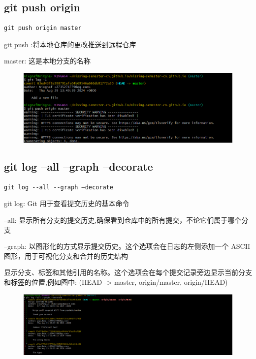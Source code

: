 \documentclass{article}
\begin{document}
\subsection{git push origin}
\lstset{language=bash}
\begin{lstlisting}
git push origin master
\end{lstlisting}

\noindent git push :将本地仓库的更改推送到远程仓库

\noindent master: 这是本地分支的名称
\begin{figure}[h]
    \centering
    \includegraphics[width=1\linewidth]{picture/gitpush.png}
\end{figure}

\subsection{git log --all --graph –decorate}
\lstset{language=bash}
\begin{lstlisting}
git log --all --graph –decorate
\end{lstlisting}

\noindent git log: Git 用于查看提交历史的基本命令

\noindent --all: 显示所有分支的提交历史,确保看到仓库中的所有提交，不论它们属于哪个分支

\noindent --graph: 以图形化的方式显示提交历史。这个选项会在日志的左侧添加一个 ASCII 图形，用于可视化分支和合并的历史结构

\noindent 显示分支、标签和其他引用的名称。这个选项会在每个提交记录旁边显示当前分支和标签的位置,例如图中: (HEAD -> master, origin/master, origin/HEAD)
\begin{figure}[h]
    \centering
    \includegraphics[width=1\linewidth]{picture/getlogall.png}
\end{figure}
\end{document}
